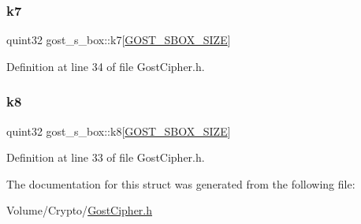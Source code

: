 \subsubsection{\texorpdfstring{k7}{k7}}
{\footnotesize\ttfamily quint32 gost\+\_\+s\+\_\+box\+::k7\mbox{[}\hyperlink{_gost_cipher_8h_aa62d143b3b91c5333e7835aaf1c3b2de}{G\+O\+S\+T\+\_\+\+S\+B\+O\+X\+\_\+\+S\+I\+ZE}\mbox{]}}



Definition at line 34 of file Gost\+Cipher.\+h.

\mbox{\label{structgost__s__box_a38754c1b41b814aa756cd9a1f1e9a5e6}} 
\subsubsection{\texorpdfstring{k8}{k8}}
{\footnotesize\ttfamily quint32 gost\+\_\+s\+\_\+box\+::k8\mbox{[}\hyperlink{_gost_cipher_8h_aa62d143b3b91c5333e7835aaf1c3b2de}{G\+O\+S\+T\+\_\+\+S\+B\+O\+X\+\_\+\+S\+I\+ZE}\mbox{]}}



Definition at line 33 of file Gost\+Cipher.\+h.



The documentation for this struct was generated from the following file\+:\begin{DoxyCompactItemize}
\item 
Volume/\+Crypto/\hyperlink{_gost_cipher_8h}{Gost\+Cipher.\+h}\end{DoxyCompactItemize}
